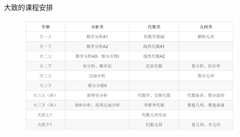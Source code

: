 \documentclass[pdf]{beamer}
\numberwithin{equation}{section}
\theoremstyle{plain}
\theoremstyle{plain}
\theoremstyle{plain}
\theoremstyle{remark}
\begin{document}
\begin{frame}{大致的课程安排}
	\begin{figure}[th]
	\begin{minipage}[t]{.99\textwidth}
		\centering
		\includegraphics[width=.99\textwidth]{figures/class.jpg}
		\label{fig3}
	\end{minipage}
\end{figure}
\end{frame}
\end{document}
